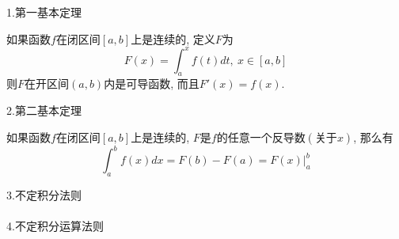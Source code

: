 \documentclass[UTF8, fontset=ubuntu]{ctexart}
\theoremstyle{empty}
\begin{document}
1.第一基本定理\\[-4ex]
\begin{theorem}[微积分的第一基本定理:]
如果函数$f$在闭区间$[a,b]$上是连续的, 定义$F$为
\[F(x)=\int_a^xf(t)dt,\ x\in[a,b]\]
则$F$在开区间$(a,b)$内是可导函数, 而且$F'(x)=f(x)$.
\end{theorem}\vspace{4ex}

2.第二基本定理\\[-4ex]
\begin{theorem}[微积分的第二基本定理:]
如果函数$f$在闭区间$[a,b]$上是连续的, $F$是$f$的任意一个反导数$(\text{关于}x)$, 那么有
\[\int_a^bf(x)dx=F(b)-F(a)=F(x)\Big|_a^b\]
\end{theorem}\vspace{4ex}

3.不定积分法则\\[1ex]
\\[4ex]

4.不定积分运算法则\\[-4ex]
\begin{center}
\\[2ex]
\end{center}\vspace{4ex}
\end{document}
